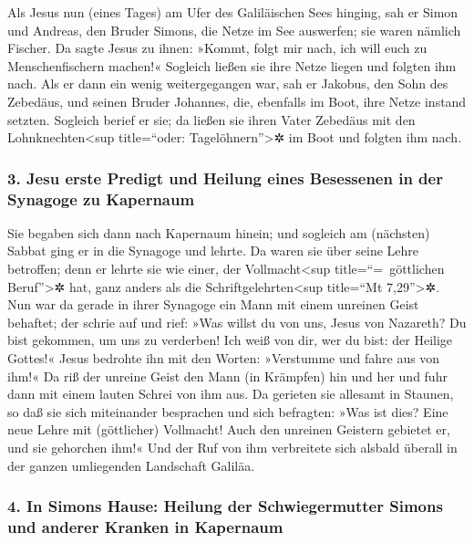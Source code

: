  Als Jesus nun (eines Tages) am Ufer des Galiläischen
Sees hinging, sah er Simon und Andreas, den Bruder Simons, die Netze im
See auswerfen; sie waren nämlich Fischer.  Da sagte Jesus
zu ihnen: »Kommt, folgt mir nach, ich will euch zu Menschenfischern
machen!«  Sogleich ließen sie ihre Netze liegen und
folgten ihm nach.  Als er dann ein wenig weitergegangen
war, sah er Jakobus, den Sohn des Zebedäus, und seinen Bruder Johannes,
die, ebenfalls im Boot, ihre Netze instand setzten. 
Sogleich berief er sie; da ließen sie ihren Vater Zebedäus mit den
Lohnknechten\textless sup title=``oder: Tagelöhnern''\textgreater✲ im
Boot und folgten ihm nach.

\hypertarget{jesu-erste-predigt-und-heilung-eines-besessenen-in-der-synagoge-zu-kapernaum}{%
\subsubsection{3. Jesu erste Predigt und Heilung eines Besessenen in der
Synagoge zu
Kapernaum}\label{jesu-erste-predigt-und-heilung-eines-besessenen-in-der-synagoge-zu-kapernaum}}

 Sie begaben sich dann nach Kapernaum hinein; und
sogleich am (nächsten) Sabbat ging er in die Synagoge und lehrte.
 Da waren sie über seine Lehre betroffen; denn er lehrte
sie wie einer, der Vollmacht\textless sup title=``=~göttlichen
Beruf''\textgreater✲ hat, ganz anders als die
Schriftgelehrten\textless sup title=``Mt 7,29''\textgreater✲.
 Nun war da gerade in ihrer Synagoge ein Mann mit einem
unreinen Geist behaftet; der schrie auf  und rief: »Was
willst du von uns, Jesus von Nazareth? Du bist gekommen, um uns zu
verderben! Ich weiß von dir, wer du bist: der Heilige Gottes!«
 Jesus bedrohte ihn mit den Worten: »Verstumme und fahre
aus von ihm!«  Da riß der unreine Geist den Mann (in
Krämpfen) hin und her und fuhr dann mit einem lauten Schrei von ihm aus.
 Da gerieten sie allesamt in Staunen, so daß sie sich
miteinander besprachen und sich befragten: »Was ist dies? Eine neue
Lehre mit (göttlicher) Vollmacht! Auch den unreinen Geistern gebietet
er, und sie gehorchen ihm!«  Und der Ruf von ihm
verbreitete sich alsbald überall in der ganzen umliegenden Landschaft
Galiläa.

\hypertarget{in-simons-hause-heilung-der-schwiegermutter-simons-und-anderer-kranken-in-kapernaum}{%
\subsubsection{4. In Simons Hause: Heilung der Schwiegermutter Simons
und anderer Kranken in
Kapernaum}\label{in-simons-hause-heilung-der-schwiegermutter-simons-und-anderer-kranken-in-kapernaum}}

